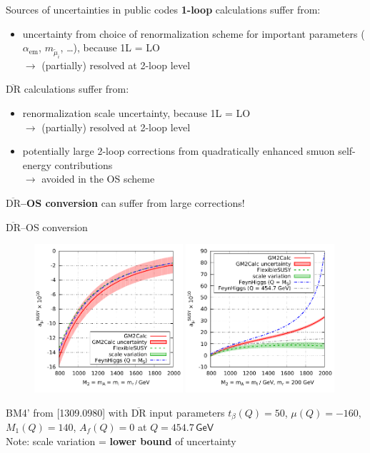 \documentclass[hyperref={pdfpagelabels=false},ngerman]{beamer}
\newcommand{\eh}[1]{\,\mathsf{#1}}
\renewcommand{\emph}{\textbf}
\newcommand{\DRbar}{\ensuremath{\overline{\text{DR}}}\xspace}
\begin{document}
\begin{frame}{Sources of uncertainties in public codes}
  \emph{1-loop} calculations suffer from:
  \begin{itemize}
  \item uncertainty from choice of renormalization scheme for
    important parameters ($\alpha_{\text{em}}$, $m_{\tilde{\mu}_i}$,
    \ldots), because 1L = LO\\
    $\rightarrow$ (partially) resolved at 2-loop level
  \end{itemize}
  \vspace{1em}
  \emph{\DRbar} calculations suffer from:
  \begin{itemize}
  \item renormalization scale uncertainty, because 1L = LO\\
    $\rightarrow$ (partially) resolved at 2-loop level
  \item potentially large 2-loop corrections from quadratically
    enhanced smuon self-energy contributions\\
    $\rightarrow$ avoided in the OS scheme
  \end{itemize}
  \vspace{1em}
  \emph{\DRbar--OS conversion} can suffer from large corrections!
\end{frame}

\begin{frame}{\DRbar--OS conversion}
  \begin{figure}
    \centering
    \includegraphics[width=0.49\textwidth]{plots/OS-vs-DR}
    \includegraphics[width=0.49\textwidth]{plots/OS-vs-DR_splitting}
  \end{figure}
  BM4' from [1309.0980] with \DRbar input parameters
  $t_\beta(Q) = 50$, $\mu(Q) = -160$, $M_1(Q) = 140$, $A_f(Q) = 0$
  at $Q = 454.7\eh{GeV}$\\
  Note: scale variation = \emph{lower bound} of uncertainty
\end{frame}
\end{document}
